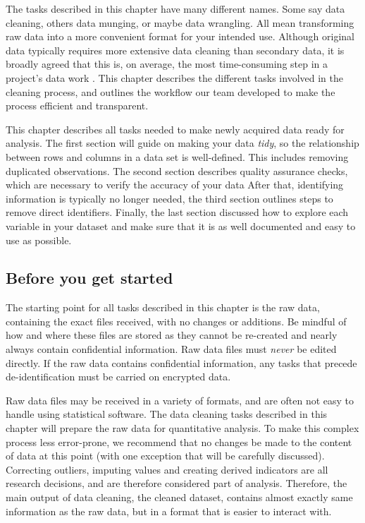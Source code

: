 
\begin{fullwidth}

The tasks described in this chapter have many different names.
Some say data cleaning, others data munging, or maybe data wrangling.
All mean transforming raw data into a more convenient format for your intended use.
Although original data typically requires more extensive data cleaning than secondary data,
it is broadly agreed that this is, on average, the most time-consuming step in a project's data work \citep{dasu2003exploratory}.
This chapter describes the different tasks involved in the cleaning process,
and outlines the workflow our team developed to make the process efficient and transparent.

This chapter describes all tasks needed to make newly acquired data ready for analysis.
The first section will guide on making your data \textit{tidy},
so the relationship between rows and columns in a data set is well-defined.
This includes removing duplicated observations.
The second section describes quality assurance checks, which are necessary to verify the accuracy of your data
After that, identifying information is typically no longer needed,
the third section outlines steps to remove direct identifiers.
Finally, the last section discussed how to explore each variable in your dataset and 
make sure that it is as well documented and easy to use as possible.


\end{fullwidth}


\subsection{Before you get started}

The starting point for all tasks described in this chapter is the raw data,
containing the exact files received, with no changes or additions.
Be mindful of how and where these files are stored
as they cannot be re-created and nearly always contain confidential information.
Raw data files must \textit{never} be edited directly.
If the raw data contains confidential information,
any tasks that precede de-identification must be carried on encrypted data.
 
Raw data files may be received in a variety of formats, 
and are often not easy to handle using statistical software.
The data cleaning tasks described in this chapter will prepare the raw data
for quantitative analysis.
To make this complex process less error-prone,
we recommend that no changes be made to the content of data at this point
(with one exception that will be carefully discussed).
Correcting outliers, imputing values and creating derived indicators
are all research decisions, and are therefore considered part of analysis.
Therefore, the main output of data cleaning, the cleaned dataset,
contains almost exactly same information as the raw data,
but in a format that is easier to interact with.  

